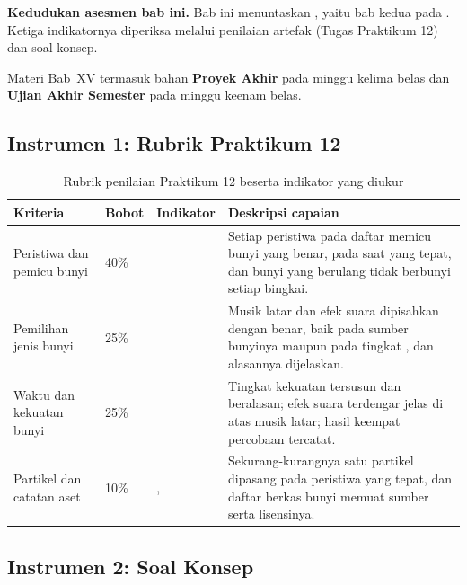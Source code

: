 \label{sec:asesmen-audio}

\begin{asesmenbox}
\textbf{Kedudukan asesmen bab ini.} Bab ini menuntaskan , yaitu
bab kedua pada . Ketiga indikatornya diperiksa melalui penilaian
artefak  (Tugas Praktikum 12) dan soal konsep.

\vspace{0.4em}
Materi Bab~XV termasuk bahan \textbf{Proyek Akhir} pada minggu kelima belas
dan \textbf{Ujian Akhir Semester} pada minggu keenam belas.
\end{asesmenbox}

\subsection*{Instrumen 1: Rubrik Praktikum 12}

\begin{table}[htbp]
\centering
\caption{Rubrik penilaian Praktikum 12 beserta indikator yang diukur}
\label{tab:rubrik-praktikum-12}
{\setlength{\tabcolsep}{4pt}\footnotesize%
\begin{tabularx}{\textwidth}{@{}L{3.2cm} C{1.3cm} C{2.1cm} Y@{}}
\toprule
\headrow \textbf{Kriteria} & \textbf{Bobot} & \textbf{Indikator} & \textbf{Deskripsi capaian} \\
\midrule
Peristiwa dan pemicu bunyi & 40\% &  &
Setiap peristiwa pada daftar memicu bunyi yang benar, pada saat yang tepat, dan
bunyi yang berulang tidak berbunyi setiap bingkai. \\
\addlinespace
Pemilihan jenis bunyi & 25\% &  &
Musik latar dan efek suara dipisahkan dengan benar, baik pada sumber bunyinya
maupun pada tingkat , dan alasannya dijelaskan. \\
\addlinespace
Waktu dan kekuatan bunyi & 25\% &  &
Tingkat kekuatan tersusun dan beralasan; efek suara terdengar jelas di atas
musik latar; hasil keempat percobaan tercatat. \\
\addlinespace
Partikel dan catatan aset & 10\% & ,  &
Sekurang-kurangnya satu partikel dipasang pada peristiwa yang tepat, dan daftar
berkas bunyi memuat sumber serta lisensinya. \\
\bottomrule
\end{tabularx}}
\end{table}

\subsection*{Instrumen 2: Soal Konsep}

